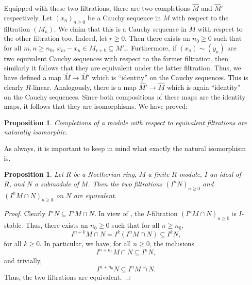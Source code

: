 \documentclass[11pt]{article}
\theoremstyle{thmstyle}
\newtheorem{proposition}[theorem]{Proposition}
\theoremstyle{defstyle}
\newcommand{\wh}[1]{\widehat{#1}}
\renewcommand{\ge}{\geqslant}
\begin{document}
Equipped with these two filtrations, there are two completions $\wh M$ and $\wh M'$ respectively. Let $(x_n)_{n\ge 0}$ be a Cauchy sequence in $M$ with respect to the filtration $(M_n)$. We claim that this is a Cauchy sequence in $M$ with respect to the other filtration too. Indeed, let $r\ge 0$. Then there exists an $n_0\ge 0$ such that for all $m,n\ge n_0$, $x_m - x_n\in M_{r + k}\subseteq M'_r$. Furthermore, if $(x_n)\sim (y_n)$ are two equivalent Cauchy sequences with respect to the former filtration, then similarly it follows that they are equivalent under the latter filtration. Thus, we have defined a map $\wh M\to\wh M'$ which is ``identity'' on the Cauchy sequences. This is clearly $R$-linear. Analogously, there is a map $\wh M'\to\wh M$ which is again ``identity'' on the Cauchy sequences. Since both compositions of these maps are the identity maps, it follows that they are isomorphisms. We have proved: 
\begin{proposition}
    Completions of a module with respect to equivalent filtrations are naturally isomorphic.
\end{proposition}
As always, it is important to keep in mind what exactly the natural isomorphism is.

\begin{proposition}
    Let $R$ be a Noetherian ring, $M$ a finite $R$-module, $I$ an ideal of $R$, and $N$ a submodule of $M$. Then the two filtrations $(I^n N)_{n\ge 0}$ and $(I^n M\cap N)_{n\ge 0}$ on $N$ are equivalent.
\end{proposition}
\begin{proof}
    Clearly $I^n N\subseteq I^n M\cap N$. In view of , the $I$-filtration $(I^n M\cap N)_{n\ge 0}$ is $I$-stable. Thus, there exists an $n_0\ge 0$ such that for all $n\ge n_0$, 
    \begin{equation*}
        I^{n + k}M\cap N = I^k\left(I^n M\cap N\right)\subseteq I^k N,
    \end{equation*}
    for all $k\ge 0$. In particular, we have, for all $n\ge 0$, the inclusions 
    \begin{equation*}
        I^{n + n_0}M\cap N\subseteq I^n N,
    \end{equation*}
    and trivially, 
    \begin{equation*}
        I^{n + n_0}N\subseteq I^n M\cap N.
    \end{equation*}
    Thus, the two filtrations are equivalent.
\end{proof}
\end{document}
